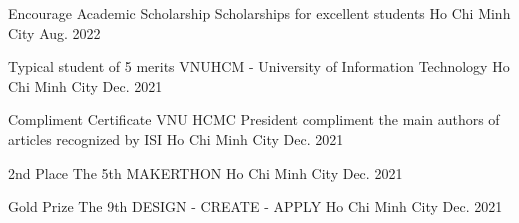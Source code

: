 \begin{cvhonors}
  \cvhonor
    {Encourage Academic Scholarship} %
    {Scholarships for excellent students} %
    {Ho Chi Minh City} %
    {Aug. 2022} %
    
  \cvhonor
    {Typical student of 5 merits} %
    {VNUHCM - University of Information Technology} %
    {Ho Chi Minh City} %
    {Dec. 2021} %
    
  \cvhonor
    {Compliment Certificate} %
    {VNU HCMC President compliment the main authors of articles recognized by ISI} %
    {Ho Chi Minh City} %
    {Dec. 2021} %
    
  \cvhonor
    {2nd Place} %
    {The 5th MAKERTHON} %
    {Ho Chi Minh City} %
    {Dec. 2021} %

    
  \cvhonor
    {Gold Prize} %
    {The 9th DESIGN - CREATE - APPLY} %
    {Ho Chi Minh City} %
    {Dec. 2021} %

    
    
    

\end{cvhonors}
